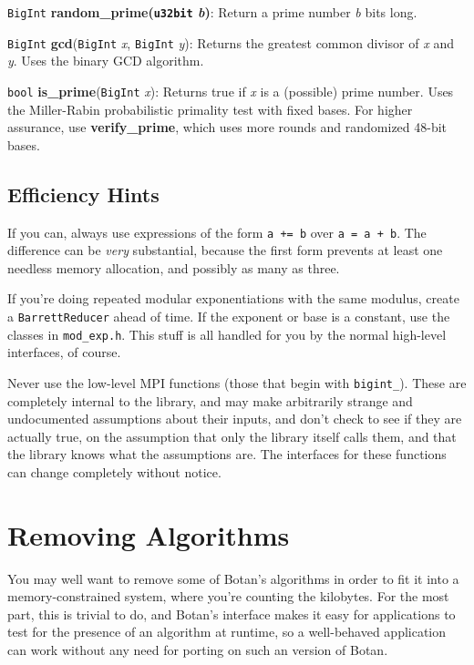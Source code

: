 \documentclass{article}
\newcommand{\filename}[1]{\texttt{#1}}
\newcommand{\function}[1]{\textbf{#1}}
\newcommand{\type}[1]{\texttt{#1}}
\renewcommand{\arg}[1]{\textsl{#1}}
\begin{document}
\type{BigInt} \function{random\_prime(\type{u32bit} \arg{b})}: Return a prime
number \arg{b} bits long.

\type{BigInt} \function{gcd}(\type{BigInt} \arg{x}, \type{BigInt} \arg{y}):
Returns the greatest common divisor of \arg{x} and \arg{y}. Uses the binary
GCD algorithm.

\type{bool} \function{is\_prime}(\type{BigInt} \arg{x}): Returns true if
\arg{x} is a (possible) prime number. Uses the Miller-Rabin probabilistic
primality test with fixed bases. For higher assurance, use
\function{verify\_prime}, which uses more rounds and randomized 48-bit bases.

\subsection{Efficiency Hints}

If you can, always use expressions of the form \verb|a += b| over
\verb|a = a + b|. The difference can be \emph{very} substantial, because the
first form prevents at least one needless memory allocation, and possibly as
many as three.

If you're doing repeated modular exponentiations with the same modulus, create
a \type{BarrettReducer} ahead of time. If the exponent or base is a constant,
use the classes in \filename{mod\_exp.h}. This stuff is all handled for you by
the normal high-level interfaces, of course.

Never use the low-level MPI functions (those that begin with
\texttt{bigint\_}). These are completely internal to the library, and
may make arbitrarily strange and undocumented assumptions about their
inputs, and don't check to see if they are actually true, on the
assumption that only the library itself calls them, and that the
library knows what the assumptions are. The interfaces for these
functions can change completely without notice.

\pagebreak

\section{Removing Algorithms}

You may well want to remove some of Botan's algorithms in order to fit it into
a memory-constrained system, where you're counting the kilobytes. For the most
part, this is trivial to do, and Botan's interface makes it easy for
applications to test for the presence of an algorithm at runtime, so a
well-behaved application can work without any need for porting on such an
version of Botan.
\end{document}
